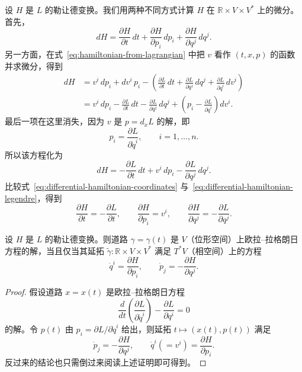 设 $H$ 是 $L$ 的勒让德变换。我们用两种不同方式计算 $H$ 在 $\mathbb R\times V\times V^*$ 上的微分。首先，
\begin{equation}\label{eq:differential-hamiltonian-coordinates}
  dH=\frac{\partial H}{\partial t}\,dt
  +\frac{\partial H}{\partial p_i}\,dp_i
  +\frac{\partial H}{\partial q^j}\,dq^j.
\end{equation}
另一方面，在式~\eqref{eq:hamiltonian-from-lagrangian} 中把 $v$ 看作 $(t,x,p)$ 的函数并求微分，得到
\begin{align*}
  dH
  &=v^i\,dp_i+dv^i\,p_i
    -\left(
      \frac{\partial L}{\partial t}\,dt
      +\frac{\partial L}{\partial q^j}\,dq^j
      +\frac{\partial L}{\partial\dot q^i}\,dv^i
    \right)\\
  &=v^i\,dp_i-\frac{\partial L}{\partial t}\,dt
    -\frac{\partial L}{\partial q^j}\,dq^j
    +\left(p_i-\frac{\partial L}{\partial\dot q^i}\right)dv^i.
\end{align*}
最后一项在这里消失，因为 $v$ 是 $p=d_{\dot x}L$ 的解，即
\[
  p_i=\frac{\partial L}{\partial\dot q^i},
  \qquad i=1,\ldots,n.
\]
所以该方程化为
\begin{equation}\label{eq:differential-hamiltonian-legendre}
  dH=-\frac{\partial L}{\partial t}\,dt
  +v^i\,dp_i-\frac{\partial L}{\partial q^j}\,dq^j.
\end{equation}
比较式~\eqref{eq:differential-hamiltonian-coordinates} 与~\eqref{eq:differential-hamiltonian-legendre}，得到
\[
  \frac{\partial H}{\partial t}=-\frac{\partial L}{\partial t},
  \qquad
  \frac{\partial H}{\partial p_i}=v^i,
  \qquad
  \frac{\partial H}{\partial q^j}=-\frac{\partial L}{\partial q^j}.
\]

\begin{theorem}
\label{thm:euler-lagrange-hamilton-coordinate}
设 $H$ 是 $L$ 的勒让德变换。则道路 $\gamma=\gamma(t)$ 是 $V$（位形空间）上欧拉--拉格朗日方程的解，当且仅当其延拓 $\widetilde\gamma:\mathbb R\times V\times V^*$ 满足 $T^*V$（相空间）上的方程
\begin{equation}\label{eq:hamilton-equation}
  \dot q^i=\frac{\partial H}{\partial p_i},
  \qquad
  \dot p_j=-\frac{\partial H}{\partial q^j}.
\end{equation}
\end{theorem}

\begin{proof}
假设道路 $x=x(t)$ 是欧拉--拉格朗日方程
\[
  \frac d{dt}\left(\frac{\partial L}{\partial\dot q^i}\right)
  -\frac{\partial L}{\partial q^i}=0
\]
的解。令 $p(t)$ 由 $p_i=\partial L/\partial\dot q^i$ 给出，则延拓 $t\longmapsto(x(t),p(t))$ 满足
\[
  \dot p_j=-\frac{\partial H}{\partial q^j},
  \qquad
  \dot q^i(=v^i)=\frac{\partial H}{\partial p_i}.
\]
反过来的结论也只需倒过来阅读上述证明即可得到。
\end{proof}

